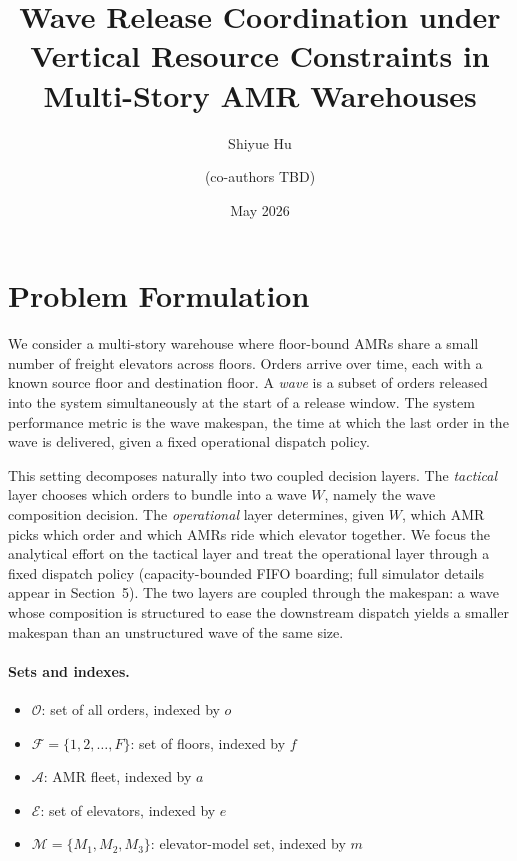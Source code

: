 \documentclass[11pt, a4paper]{article}
\title{Wave Release Coordination under Vertical Resource Constraints in Multi-Story AMR Warehouses}
\author{Shiyue Hu \and (co-authors TBD)}
\date{May 2026}
\begin{document}
\maketitle

\section{Problem Formulation}\label{sec:problem}

We consider a multi-story warehouse where floor-bound AMRs share a small number of freight elevators across floors. Orders arrive over time, each with a known source floor and destination floor. A \emph{wave} is a subset of orders released into the system simultaneously at the start of a release window. The system performance metric is the wave makespan, the time at which the last order in the wave is delivered, given a fixed operational dispatch policy.

This setting decomposes naturally into two coupled decision layers. The \emph{tactical} layer chooses which orders to bundle into a wave $W$, namely the wave composition decision. The \emph{operational} layer determines, given $W$, which AMR picks which order and which AMRs ride which elevator together. We focus the analytical effort on the tactical layer and treat the operational layer through a fixed dispatch policy (capacity-bounded FIFO boarding; full simulator details appear in Section~5). The two layers are coupled through the makespan: a wave whose composition is structured to ease the downstream dispatch yields a smaller makespan than an unstructured wave of the same size.

\paragraph{Sets and indexes.}
\begin{itemize}[noitemsep, topsep=2pt, leftmargin=1.5em]
  \item $\mathcal{O}$: set of all orders, indexed by $o$
  \item $\mathcal{F} = \{1, 2, \ldots, F\}$: set of floors, indexed by $f$
  \item $\mathcal{A}$: AMR fleet, indexed by $a$
  \item $\mathcal{E}$: set of elevators, indexed by $e$
  \item $\mathcal{M} = \{M_1, M_2, M_3\}$: elevator-model set, indexed by $m$
\end{itemize}
\end{document}
